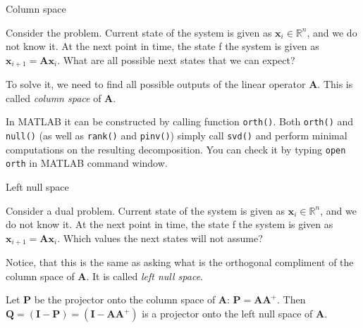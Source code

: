\documentclass{beamer}
\begin{document}
\begin{frame}{Column space}
\begin{flushleft}

Consider the problem. Current state of the system is given as $\mathbf{x}_i \in \mathbb{R}^n$, and we do not know it. At the next point in time, the state f the system is given as $\mathbf{x}_{i+1} = \mathbf{A} \mathbf{x}_{i}$. What are all possible next states that we can expect?

\bigskip

To solve it, we need to find all possible outputs of the linear operator $\mathbf{A}$. This is called \emph{column space} of $\mathbf{A}$. 

\bigskip

In MATLAB it can be constructed by calling function \texttt{orth()}. Both \texttt{orth()} and \texttt{null()} (as well as \texttt{rank()} and \texttt{pinv()}) simply call \texttt{svd()} and perform minimal computations on the resulting decomposition. You can check it by typing \texttt{open orth} in MATLAB command window.


\end{flushleft}
\end{frame}


\begin{frame}{Left null space}
\begin{flushleft}

Consider a dual problem. Current state of the system is given as $\mathbf{x}_i \in \mathbb{R}^n$, and we do not know it. At the next point in time, the state f the system is given as $\mathbf{x}_{i+1} = \mathbf{A} \mathbf{x}_{i}$. Which values the next states will not assume?

\bigskip

Notice, that this is the same as asking what is the orthogonal compliment of the column space of $\mathbf{A}$. It is called \emph{left null space}.

\bigskip

Let $\mathbf{P}$ be the projector onto the column space of $\mathbf{A}$: $\mathbf{P} = \mathbf{A}\mathbf{A}^+$. Then $\mathbf{Q} = (\mathbf{I} - \mathbf{P}) = (\mathbf{I} - \mathbf{A}\mathbf{A}^+)$ is a projector onto the left null space of $\mathbf{A}$.


\end{flushleft}
\end{frame}
\end{document}
